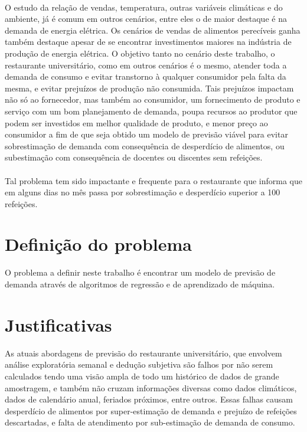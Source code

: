 \documentclass[	12pt, Times, openright, twoside, a4paper, english, brazil]{abntex2}
\begin{document}
        \paragraph*{} O estudo da relação de vendas, temperatura, outras variáveis climáticas e do ambiente, já é comum em outros cenários, entre eles o de maior destaque é na demanda de energia elétrica. Os cenários de vendas de alimentos perecíveis ganha também destaque apesar de se encontrar investimentos maiores na indústria de produção de energia elétrica. O objetivo tanto no cenário deste trabalho, o restaurante universitário, como em outros cenários é o mesmo, atender toda a demanda de consumo e evitar transtorno à qualquer consumidor pela falta da mesma, e evitar prejuízos de produção não consumida. Tais prejuízos impactam não só ao fornecedor, mas também ao consumidor, um fornecimento de produto e serviço com um bom planejamento de demanda, poupa recursos ao produtor que podem ser investidos em melhor qualidade de produto, e menor preço ao consumidor a fim de que seja obtido um modelo de previsão viável para evitar sobrestimação de demanda com consequência de desperdício de alimentos, ou subestimação com consequência de docentes ou discentes sem refeições. 

        \paragraph*{} Tal problema tem sido impactante e frequente para o restaurante que informa que em alguns
        dias no mês passa por sobrestimação e desperdício superior a 100 refeições. 

      \section{Definição do problema}
        O problema a definir neste trabalho é encontrar um modelo de previsão de demanda através de algoritmos de regressão e de aprendizado de máquina.

      \section{Justificativas}
        As atuais abordagens de previsão do restaurante universitário, que envolvem análise exploratória semanal e dedução subjetiva são falhos por não serem calculados tendo uma visão ampla de todo um histórico de dados de grande amostragem, e também não cruzam informações diversas como dados climáticos, dados de calendário anual, feriados próximos, entre outros. Essas falhas causam desperdício de alimentos por super-estimação de demanda e prejuízo de refeições descartadas, e falta de atendimento por sub-estimação de demanda de consumo.
\end{document}
